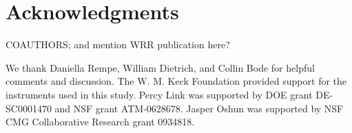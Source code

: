

\section*{Acknowledgments}

COAUTHORS; and mention WRR publication here?

We thank Daniella Rempe, William Dietrich, and Collin Bode for helpful comments and discussion.  The W. M. Keck Foundation provided support for the instruments used in this study.  Percy Link was supported by DOE grant DE-SC0001470 and NSF grant ATM-0628678.  Jasper Oshun was supported by NSF CMG Collaborative Research grant 0934818.



%
